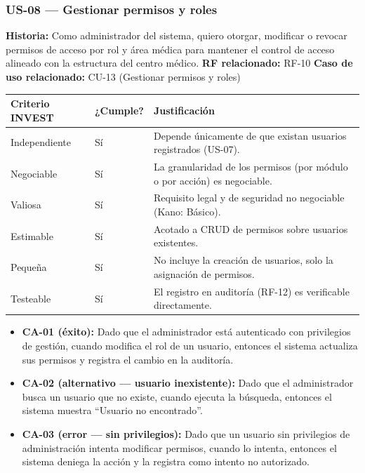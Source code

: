 \documentclass[11pt,a4paper]{article}
\providecommand{\tightlist}{%
	\setlength{\itemsep}{0pt}\setlength{\parskip}{0pt}}
\begin{document}
	\subsubsection{US-08 --- Gestionar permisos y roles}
	
	\textbf{Historia:} Como administrador del sistema, quiero otorgar, modificar o revocar permisos de acceso por rol y área médica para mantener el control de acceso alineado con la estructura del centro médico.
	\textbf{RF relacionado:} RF-10
	\textbf{Caso de uso relacionado:} CU-13 (Gestionar permisos y roles)
	
	\begin{longtable}{p{} p{} p{}}
		
		
		\toprule
		\textbf{Criterio INVEST} &
		\textbf{¿Cumple?} &
		\textbf{Justificación} \\
		\midrule
		\endhead
		
		Independiente & Sí & Depende únicamente de que existan usuarios registrados (US-07). \\
		Negociable & Sí & La granularidad de los permisos (por módulo o por acción) es negociable. \\
		Valiosa & Sí & Requisito legal y de seguridad no negociable (Kano: Básico). \\
		Estimable & Sí & Acotado a CRUD de permisos sobre usuarios existentes. \\
		Pequeña & Sí & No incluye la creación de usuarios, solo la asignación de permisos. \\
		Testeable & Sí & El registro en auditoría (RF-12) es verificable directamente. \\
		\bottomrule
	\end{longtable}
	
	\begin{itemize}
		\tightlist
		\item
		\textbf{CA-01 (éxito):} Dado que el administrador está autenticado con privilegios de gestión, cuando modifica el rol de un usuario, entonces el sistema actualiza sus permisos y registra el cambio en la auditoría.
		\item
		\textbf{CA-02 (alternativo --- usuario inexistente):} Dado que el administrador busca un usuario que no existe, cuando ejecuta la búsqueda, entonces el sistema muestra ``Usuario no encontrado''.
		\item
		\textbf{CA-03 (error --- sin privilegios):} Dado que un usuario sin privilegios de administración intenta modificar permisos, cuando lo intenta, entonces el sistema deniega la acción y la registra como intento no autorizado.
	\end{itemize}
	
\end{document}
